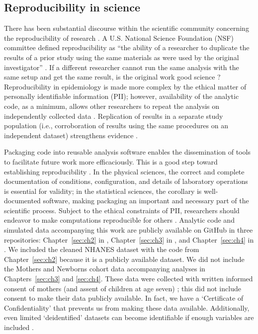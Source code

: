 \subsection{Reproducibility in science}\label{sec:repro}
There has been substantial discourse within the scientific community concerning the reproducibility of research \cite{baker20161}. A U.S. National Science Foundation (NSF) committee defined reproducibility as ``the ability of a researcher to duplicate the results of a prior study using the same materials as were used by the original investigator'' \cite{cacioppo2015social}. If a different researcher cannot run the same analysis with the same setup and get the same result, is the original work good science \cite{goodman2016does}? Reproducibility in epidemiology is made more complex by the ethical matter of personally identifiable information (PII); however, availability of the analytic code, as a minimum, allows other researchers to repeat the analysis on independently collected data \cite{peng2011reproducible}. Replication of results in a separate study population (i.e., corroboration of results using the same procedures on an independent dataset) strengthens evidence \cite{peng2006reproducible}.

Packaging code into reusable analysis software enables the dissemination of tools to facilitate future work more efficaciously. This is a good step toward establishing reproducibility \cite{collberg2015repeatability}. In the physical sciences, the correct and complete documentation of conditions, configuration, and details of laboratory operations is essential for validity; in the statistical sciences, the corollary is well-documented software, making packaging an important and necessary part of the scientific process. Subject to the ethical constraints of PII, researchers should endeavor to make computations reproducible for others \cite{barnes2010publish}. Analytic code and simulated data accompanying this work are publicly available on GitHub in three repositories: Chapter~\ref{sec:ch2} in \texttt{\href{https://github.com/lizzyagibson/Principal.Component.Pursuit}{}}, Chapter~\ref{sec:ch3} in \texttt{\href{https://github.com/lizzyagibson/BN2MF}{}}, and Chapter~\ref{sec:ch4} in \texttt{\href{https://github.com/lizzyagibson/edc-patterns-wisc}{}}. We included the cleaned NHANES dataset with the code from Chapter~\ref{sec:ch2} because it is a publicly available dataset. We did not include the Mothers and Newborns cohort data accompanying analyses in Chapters~\ref{sec:ch3} and \ref{sec:ch4}. These data were collected with written informed consent of mothers (and assent of children at age seven) \cite{perera03}; this did not include consent to make their data publicly available. In fact, we have a `Certificate of Confidentiality' that prevents us from making these data available. Additionally, even limited `deidentified' datasets can become identifiable if enough variables are included \cite{narayanan2008robust}.

